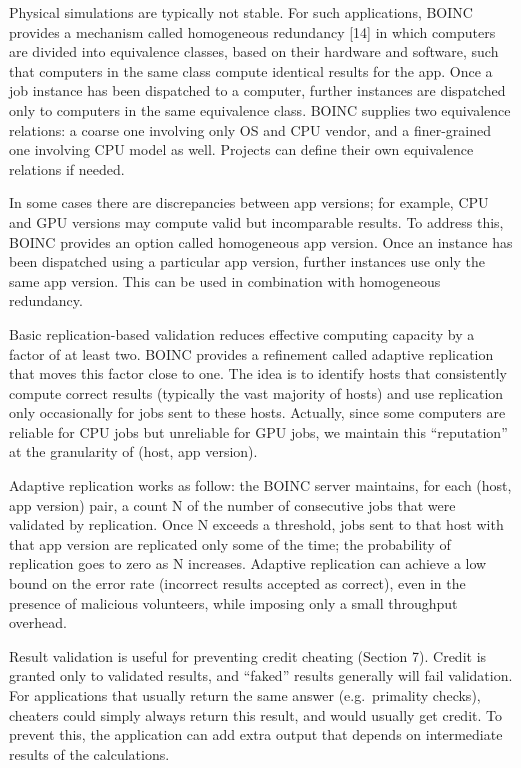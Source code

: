 \documentclass[
]{article}
\begin{document}
Physical simulations are typically not stable. For such applications,
BOINC provides a mechanism called homogeneous redundancy {[}14{]} in
which computers are divided into equivalence classes, based on their
hardware and software, such that computers in the same class compute
identical results for the app. Once a job instance has been dispatched
to a computer, further instances are dispatched only to computers in the
same equivalence class. BOINC supplies two equivalence relations: a
coarse one involving only OS and CPU vendor, and a finer-grained one
involving CPU model as well. Projects can define their own equivalence
relations if needed.

In some cases there are discrepancies between app versions; for example,
CPU and GPU versions may compute valid but incomparable results. To
address this, BOINC provides an option called homogeneous app version.
Once an instance has been dispatched using a particular app version,
further instances use only the same app version. This can be used in
combination with homogeneous redundancy.

Basic replication-based validation reduces effective computing capacity
by a factor of at least two. BOINC provides a refinement called adaptive
replication that moves this factor close to one. The idea is to identify
hosts that consistently compute correct results (typically the vast
majority of hosts) and use replication only occasionally for jobs sent
to these hosts. Actually, since some computers are reliable for CPU jobs
but unreliable for GPU jobs, we maintain this ``reputation'' at the
granularity of (host, app version).

Adaptive replication works as follow: the BOINC server maintains, for
each (host, app version) pair, a count N of the number of consecutive
jobs that were validated by replication. Once N exceeds a threshold,
jobs sent to that host with that app version are replicated only some of
the time; the probability of replication goes to zero as N increases.
Adaptive replication can achieve a low bound on the error rate
(incorrect results accepted as correct), even in the presence of
malicious volunteers, while imposing only a small throughput overhead.

Result validation is useful for preventing credit cheating (Section 7).
Credit is granted only to validated results, and ``faked'' results
generally will fail validation. For applications that usually return the
same answer (e.g.~primality checks), cheaters could simply always return
this result, and would usually get credit. To prevent this, the
application can add extra output that depends on intermediate results of
the calculations.
\end{document}
